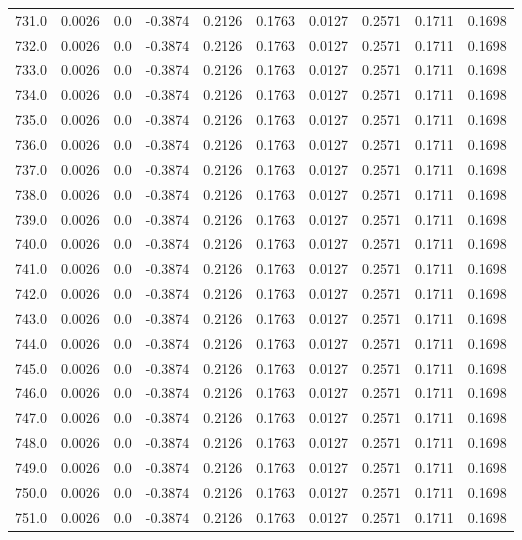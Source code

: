 \begin{longtable}{lrrrrrrrrr}
731.0 & 0.0026 & 0.0 & -0.3874 & 0.2126 & 0.1763 & 0.0127 & 0.2571 & 0.1711 & 0.1698 \\
732.0 & 0.0026 & 0.0 & -0.3874 & 0.2126 & 0.1763 & 0.0127 & 0.2571 & 0.1711 & 0.1698 \\
733.0 & 0.0026 & 0.0 & -0.3874 & 0.2126 & 0.1763 & 0.0127 & 0.2571 & 0.1711 & 0.1698 \\
734.0 & 0.0026 & 0.0 & -0.3874 & 0.2126 & 0.1763 & 0.0127 & 0.2571 & 0.1711 & 0.1698 \\
735.0 & 0.0026 & 0.0 & -0.3874 & 0.2126 & 0.1763 & 0.0127 & 0.2571 & 0.1711 & 0.1698 \\
736.0 & 0.0026 & 0.0 & -0.3874 & 0.2126 & 0.1763 & 0.0127 & 0.2571 & 0.1711 & 0.1698 \\
737.0 & 0.0026 & 0.0 & -0.3874 & 0.2126 & 0.1763 & 0.0127 & 0.2571 & 0.1711 & 0.1698 \\
738.0 & 0.0026 & 0.0 & -0.3874 & 0.2126 & 0.1763 & 0.0127 & 0.2571 & 0.1711 & 0.1698 \\
739.0 & 0.0026 & 0.0 & -0.3874 & 0.2126 & 0.1763 & 0.0127 & 0.2571 & 0.1711 & 0.1698 \\
740.0 & 0.0026 & 0.0 & -0.3874 & 0.2126 & 0.1763 & 0.0127 & 0.2571 & 0.1711 & 0.1698 \\
741.0 & 0.0026 & 0.0 & -0.3874 & 0.2126 & 0.1763 & 0.0127 & 0.2571 & 0.1711 & 0.1698 \\
742.0 & 0.0026 & 0.0 & -0.3874 & 0.2126 & 0.1763 & 0.0127 & 0.2571 & 0.1711 & 0.1698 \\
743.0 & 0.0026 & 0.0 & -0.3874 & 0.2126 & 0.1763 & 0.0127 & 0.2571 & 0.1711 & 0.1698 \\
744.0 & 0.0026 & 0.0 & -0.3874 & 0.2126 & 0.1763 & 0.0127 & 0.2571 & 0.1711 & 0.1698 \\
745.0 & 0.0026 & 0.0 & -0.3874 & 0.2126 & 0.1763 & 0.0127 & 0.2571 & 0.1711 & 0.1698 \\
746.0 & 0.0026 & 0.0 & -0.3874 & 0.2126 & 0.1763 & 0.0127 & 0.2571 & 0.1711 & 0.1698 \\
747.0 & 0.0026 & 0.0 & -0.3874 & 0.2126 & 0.1763 & 0.0127 & 0.2571 & 0.1711 & 0.1698 \\
748.0 & 0.0026 & 0.0 & -0.3874 & 0.2126 & 0.1763 & 0.0127 & 0.2571 & 0.1711 & 0.1698 \\
749.0 & 0.0026 & 0.0 & -0.3874 & 0.2126 & 0.1763 & 0.0127 & 0.2571 & 0.1711 & 0.1698 \\
750.0 & 0.0026 & 0.0 & -0.3874 & 0.2126 & 0.1763 & 0.0127 & 0.2571 & 0.1711 & 0.1698 \\
751.0 & 0.0026 & 0.0 & -0.3874 & 0.2126 & 0.1763 & 0.0127 & 0.2571 & 0.1711 & 0.1698 \\

\end{longtable}
